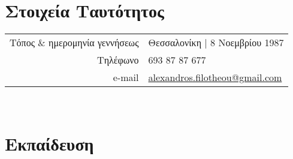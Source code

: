 \documentclass[a4paper,10pt,twoside]{article}
\begin{document}


\par{\bigskip\par}

\section{Στοιχεία Ταυτότητος}

\begin{tabular}{rp{10cm}}
Τόπος $\&$ ημερομηνία γεννήσεως 	& Θεσσαλονίκη | 8 Νοεμβρίου 1987 \\
Τηλέφωνο                          & 693 87 87 677 \\
e-mail                            & \href{mailto:alexandros.filotheou@gmail.com}{alexandros.filotheou@gmail.com}
\end{tabular}\\


\section{Εκπαίδευση}
\end{document}
